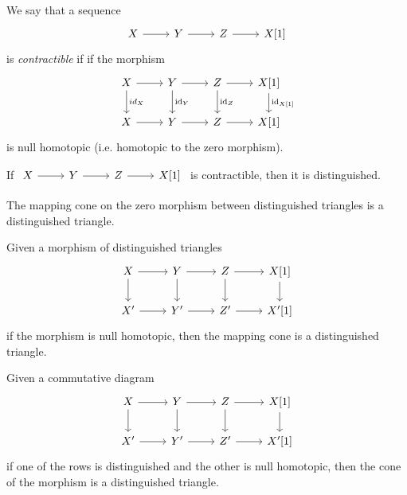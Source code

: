 \documentclass[dissertation.tex]{subfiles}
\begin{document}
\begin{defn}
  We say that a sequence
  $$\begin{tikzcd}
    X \arrow{r} & Y \arrow{r} & Z \arrow{r} & X[1]
  \end{tikzcd}$$
  is {\it contractible} if 
  if the morphism
  $$\begin{tikzcd}
    X \arrow{d}{id_X}\arrow{r} & Y \arrow{r}\arrow{d}{\id_Y} & Z \arrow{r}\arrow{d}{\id_Z} & X[1] \arrow{d}{\id_{X[1]}}\\
    X \arrow{r} & Y \arrow{r} & Z \arrow{r} & X[1]
  \end{tikzcd}$$
  is null homotopic (i.e. homotopic to the zero morphism).
\end{defn}

\begin{prop}
  If 
  $\begin{tikzcd}
    X \arrow{r} & Y \arrow{r} & Z \arrow{r} & X[1]
  \end{tikzcd}$
  is contractible, then it is distinguished.
\end{prop}

\begin{lem}
  The mapping cone on the zero morphism between distinguished triangles is a distinguished triangle.
\end{lem}

\begin{cor}
  Given a morphism of distinguished triangles
  $$\begin{tikzcd}
    X \arrow{r}\arrow{d} & Y \arrow{r}\arrow{d} & Z \arrow{r}\arrow{d} & X[1]\arrow{d}\\
    X^\prime \arrow{r} & Y^\prime \arrow{r} & Z^\prime \arrow{r} & X^\prime[1]
  \end{tikzcd}$$
  if the morphism is null homotopic, then the mapping cone is a distinguished triangle.
\end{cor}
\begin{cor}
  Given a commutative diagram
  $$\begin{tikzcd}
    X \arrow{r}\arrow{d} & Y \arrow{r}\arrow{d} & Z \arrow{r}\arrow{d} & X[1]\arrow{d}\\
    X^\prime \arrow{r} & Y^\prime \arrow{r} & Z^\prime \arrow{r} & X^\prime[1]
  \end{tikzcd}$$
  if one of the rows is distinguished and the other is null homotopic, then the cone of the morphism is a distinguished triangle.
\end{cor}
\end{document}

